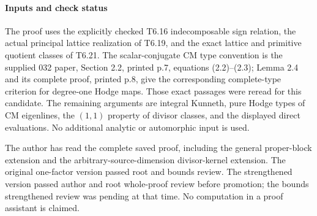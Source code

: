 \paragraph{Inputs and check status}\label{inputs-and-check-status}

The proof uses the explicitly checked T6.16 indecomposable sign relation, the actual principal lattice realization of T6.19, and the exact lattice and primitive quotient classes of T6.21. The scalar-conjugate CM type convention is the supplied 032 paper, Section 2.2, printed p.7, equations (2.2)--(2.3); Lemma 2.4 and its complete proof, printed p.8, give the corresponding complete-type criterion for degree-one Hodge maps. Those exact passages were reread for this candidate. The remaining arguments are integral Kunneth, pure Hodge types of CM eigenlines, the \((1,1)\) property of divisor classes, and the displayed direct evaluations. No additional analytic or automorphic input is used.

The author has read the complete saved proof, including the general proper-block extension and the arbitrary-source-dimension divisor-kernel extension. The original one-factor version passed root and bounds review. The strengthened version passed author and root whole-proof review before promotion; the bounds strengthened review was pending at that time. No computation in a proof assistant is claimed.
